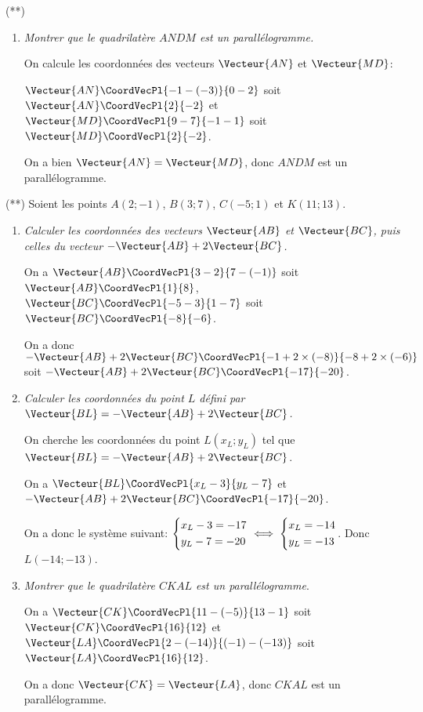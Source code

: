 \documentclass[a4paper]{article}
\begin{document}
\begin{exercice}{(**)}{}
\begin{enumerate}
    \item \textit{Montrer que le quadrilatère $ANDM$ est un parallélogramme.}
    
    On calcule les coordonnées des vecteurs $\Vecteur{AN}$ et $\Vecteur{MD}$:
    
    $\Vecteur{AN}\CoordVecPl{-1-(-3)}{0-2}$ soit $\Vecteur{AN}\CoordVecPl{2}{-2}$ et $\Vecteur{MD}\CoordVecPl{9-7}{-1-1}$ soit $\Vecteur{MD}\CoordVecPl{2}{-2}$.

    On a bien $\Vecteur{AN}=\Vecteur{MD}$, donc $ANDM$ est un parallélogramme.

  \end{enumerate}
\end{exercice}

\begin{exercice}{(**)}{}
 Soient les points $A(2;-1)$, $B(3;7)$, $C(-5;1)$ et $K(11;13)$.
 \begin{enumerate}
  \item \textit{Calculer les coordonnées des vecteurs $\Vecteur{AB}$ et $\Vecteur{BC}$, puis celles du vecteur $-\Vecteur{AB}+2\Vecteur{BC}$.}
  
  On a $\Vecteur{AB}\CoordVecPl{3-2}{7-(-1)}$ soit $\Vecteur{AB}\CoordVecPl{1}{8}$, $\Vecteur{BC}\CoordVecPl{-5-3}{1-7}$ soit $\Vecteur{BC}\CoordVecPl{-8}{-6}$.

  On a donc $-\Vecteur{AB}+2\Vecteur{BC}\CoordVecPl{-1+2\times(-8)}{-8+2\times(-6)}$ soit $-\Vecteur{AB}+2\Vecteur{BC}\CoordVecPl{-17}{-20}$.
  \item \textit{Calculer les coordonnées du point $L$ défini par $\Vecteur{BL}=-\Vecteur{AB}+2\Vecteur{BC}$.}
  
  On cherche les coordonnées du point $L(x_L;y_L)$ tel que $\Vecteur{BL}=-\Vecteur{AB}+2\Vecteur{BC}$.

  On a $\Vecteur{BL}\CoordVecPl{x_L-3}{y_L-7}$ et $-\Vecteur{AB}+2\Vecteur{BC}\CoordVecPl{-17}{-20}$.

  On a donc le système suivant:
  $\begin{dcases}
    x_L-3=-17\\
    y_L-7=-20
  \end{dcases} \iff \begin{dcases}
    x_L=-14\\
    y_L=-13
  \end{dcases}$. Donc $L(-14;-13)$.

  \item \textit{Montrer que le quadrilatère $CKAL$ est un parallélogramme}.
  
  On a $\Vecteur{CK}\CoordVecPl{11-(-5)}{13-1}$ soit $\Vecteur{CK}\CoordVecPl{16}{12}$ et $\Vecteur{LA}\CoordVecPl{2-(-14)}{(-1)-(-13)}$ soit $\Vecteur{LA}\CoordVecPl{16}{12}$.

  On a donc $\Vecteur{CK}=\Vecteur{LA}$, donc $CKAL$ est un parallélogramme.
\end{enumerate}
\end{exercice}
\end{document}
